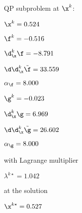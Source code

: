 QP subproblem at $\x^{k}$:

\bigskip
$\x^k=   0.524$


$\f^k =  -0.516$

$\d^k_{\x} \f =  -8.791$

$\d\d^k_{\x} \tilde \f =  33.559$

$\alpha_{\footnotesize\f} =   8.000$

\bigskip
$\g^k =  -0.023$

$\d^k_{\x}\g =   6.969$

$\d\d^k_{\x} \tilde \g =  26.602$

$\alpha_{\footnotesize\g} =   8.000$

\bigskip
with Lagrange multiplier

$\lambda^{k\star} =   1.042$

at the solution

$\x^{k\star} =   0.527$

